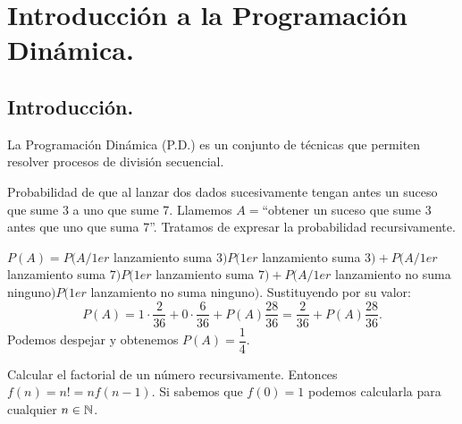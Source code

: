 \documentclass[MIOP.tex]{subfiles}
\begin{document}
\chapter{Introducción a la Programación\\ Dinámica.}


\section{Introducción.}
La Programación Dinámica (P.D.) es un conjunto de técnicas que permiten resolver procesos de división secuencial.
\begin{ej}
Probabilidad de que al lanzar dos dados sucesivamente tengan antes un suceso que sume 3 a uno que sume 7. Llamemos $A=$``obtener un suceso que sume 3 antes que uno que suma 7''. Tratamos de expresar la probabilidad recursivamente. 

$P(A)=P(A/1er$ lanzamiento suma $3)P(1er$ lanzamiento suma 3$)+P(A/1er$ lanzamiento suma $7)P(1er$ lanzamiento suma $7)+P(A/1er$ lanzamiento no suma ninguno$)P(1er$ lanzamiento no suma ninguno$)$. Sustituyendo por su valor:
$$P(A)=1\cdot\frac{2}{36}+0\cdot\frac{6}{36}+P(A)\frac{28}{36}=\frac{2}{36}+P(A)\frac{28}{36}.$$
Podemos despejar y obtenemos $P(A)=\dfrac{1}{4}$. 
\end{ej}

\begin{ej}
Calcular el factorial de un número recursivamente. Entonces $f(n)=n!=nf(n-1)$. Si sabemos que $f(0)=1$ podemos calcularla para cualquier $n\in\mathbb{N}$.
\end{ej}
\end{document}
